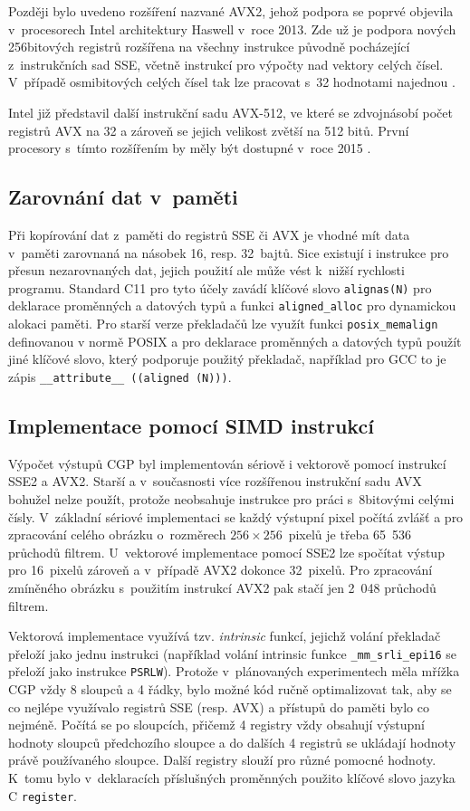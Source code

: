 Později bylo uvedeno rozšíření nazvané AVX2, jehož podpora se poprvé objevila v~procesorech Intel architektury Haswell v~roce 2013. Zde už je podpora nových 256bitových registrů rozšířena na všechny instrukce původně pocházející z~instrukčních sad SSE, včetně instrukcí pro výpočty nad vektory celých čísel. V~případě osmibitových celých čísel tak lze pracovat s~32 hodnotami najednou \cite{IntelAVXReference}.

Intel již představil další instrukční sadu AVX-512, ve které se zdvojnásobí počet registrů AVX na 32 a zároveň se jejich velikost zvětší na 512 bitů. První procesory s~tímto rozšířením by měly být dostupné v~roce 2015 \cite{IntelAvx512}.

\subsection{Zarovnání dat v~paměti}

Při kopírování dat z~paměti do registrů SSE či AVX je vhodné mít data v~paměti zarovnaná na násobek 16, resp. 32~bajtů. Sice existují i instrukce pro přesun nezarovnaných dat, jejich použití ale může vést k~nižší rychlosti programu. Standard C11 pro tyto účely zavádí klíčové slovo \texttt{alignas(N)} pro deklarace proměnných a datových typů a funkci \texttt{aligned\_alloc} pro dynamickou alokaci paměti. Pro starší verze překladačů lze využít funkci \texttt{posix\_memalign} definovanou v normě POSIX a pro deklarace proměnných a datových typů použít jiné klíčové slovo, který podporuje použitý překladač, například pro GCC to je zápis \texttt{\_\_attribute\_\_~((aligned~(N)))}.

\subsection{Implementace pomocí SIMD instrukcí}

Výpočet výstupů CGP byl implementován sériově i vektorově pomocí instrukcí SSE2 a AVX2. Starší a v~současnosti více rozšířenou instrukční sadu AVX bohužel nelze použít, protože neobsahuje instrukce pro práci s~8bitovými celými čísly. V~základní sériové implementaci se každý výstupní pixel počítá zvlášť a pro zpracování celého obrázku o~rozměrech $256\times256$~pixelů je třeba 65~536 průchodů filtrem. U~vektorové implementace pomocí SSE2 lze spočítat výstup pro 16~pixelů zároveň a v~případě AVX2 dokonce 32~pixelů. Pro zpracování zmíněného obrázku s~použitím instrukcí AVX2 pak stačí jen 2~048 průchodů filtrem.

Vektorová implementace využívá tzv. \emph{intrinsic} funkcí, jejichž volání překladač přeloží jako jednu instrukci (například volání intrinsic funkce \texttt{\_mm\_srli\_epi16} se přeloží jako instrukce \texttt{PSRLW}). Protože v~plánovaných experimentech měla mřížka CGP vždy 8 sloupců a 4 řádky, bylo možné kód ručně optimalizovat tak, aby se co nejlépe využívalo registrů SSE (resp. AVX) a přístupů do paměti bylo co nejméně. Počítá se po sloupcích, přičemž 4 registry vždy obsahují výstupní hodnoty sloupců předchozího sloupce a do dalších 4 registrů se ukládají hodnoty právě používaného sloupce. Další registry slouží pro různé pomocné hodnoty. K~tomu bylo v~deklaracích příslušných proměnných použito klíčové slovo jazyka C \texttt{register}.

